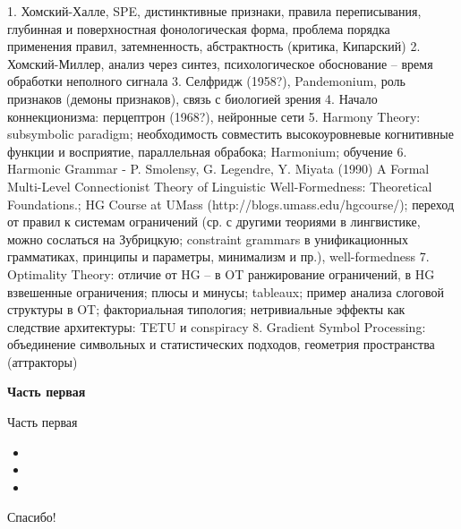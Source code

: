 \documentclass{beamer}
\begin{document}
1. Хомский-Халле, SPE, дистинктивные признаки, правила переписывания, глубинная и поверхностная фонологическая форма, проблема порядка применения правил, затемненность, абстрактность (критика, Кипарский)
2. Хомский-Миллер, анализ через синтез, психологическое обоснование -- время обработки неполного сигнала
3. Селфридж (1958?), Pandemonium, роль признаков (демоны признаков), связь с биологией зрения
4. Начало коннекционизма: перцептрон (1968?), нейронные сети
5. Harmony Theory: subsymbolic paradigm; необходимость совместить высокоуровневые когнитивные функции и восприятие, параллельная обрабока; Harmonium; обучение
6. Harmonic Grammar - P. Smolensy, G. Legendre, Y. Miyata (1990)  A Formal Multi-Level Connectionist Theory of Linguistic Well-Formedness: Theoretical Foundations.; HG Course at UMass (http://blogs.umass.edu/hgcourse/); переход от правил к системам ограничений (ср. с другими теориями в лингвистике, можно сослаться на Зубрицкую; constraint grammars в унификационных грамматиках, принципы и параметры, минимализм и пр.), well-formedness
7. Optimality Theory: отличие от HG -- в OT ранжирование ограничений, в HG взвешенные ограничения; плюсы и минусы; tableaux; пример анализа слоговой структуры в OT; факториальная типология; нетривиальные эффекты как следствие архитектуры: TETU и conspiracy
8. Gradient Symbol Processing: объединение символьных и статистических подходов, геометрия пространства (аттракторы)

\begin{frame}{}
\begin{center}
	\textbf{Часть первая}
\end{center}
\end{frame}

\begin{frame}{Часть первая}
\begin{itemize}
	\item 
	\medskip
	\item 
	\medskip
	\item  
\end{itemize}
\end{frame}




\begin{frame}{}
    \thispagestyle{empty}
    \begin{center}
        {\large Спасибо!}
    \end{center}
\end{frame}
\end{document}
